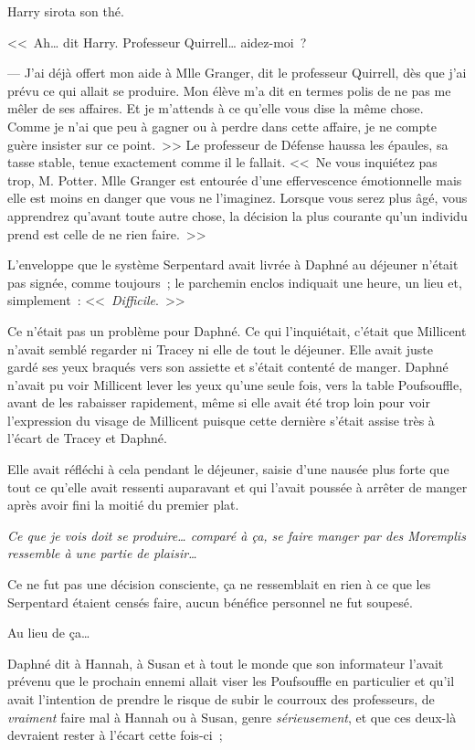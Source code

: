 Harry sirota son thé.

<<~Ah… dit Harry. Professeur Quirrell… aidez-moi~?

--- J'ai déjà offert mon aide à Mlle Granger, dit le professeur Quirrell, dès que j'ai prévu ce qui allait se produire. Mon élève m'a dit en termes polis de ne pas me mêler de ses affaires. Et je m'attends à ce qu'elle vous dise la même chose. Comme je n'ai que peu à gagner ou à perdre dans cette affaire, je ne compte guère insister sur ce point.~>> Le professeur de Défense haussa les épaules, sa tasse stable, tenue exactement comme il le fallait. <<~Ne vous inquiétez pas trop, M. Potter. Mlle Granger est entourée d'une effervescence émotionnelle mais elle est moins en danger que vous ne l'imaginez. Lorsque vous serez plus âgé, vous apprendrez qu'avant toute autre chose, la décision la plus courante qu'un individu prend est celle de ne rien faire.~>>

\later

L'enveloppe que le système Serpentard avait livrée à Daphné au déjeuner n'était pas signée, comme toujours~; le parchemin enclos indiquait une heure, un lieu et, simplement~: <<~\emph{Difficile}.~>>

Ce n'était pas un problème pour Daphné. Ce qui l'inquiétait, c'était que Millicent n'avait semblé regarder ni Tracey ni elle de tout le déjeuner. Elle avait juste gardé ses yeux braqués vers son assiette et s'était contenté de manger. Daphné n'avait pu voir Millicent lever les yeux qu'une seule fois, vers la table Poufsouffle, avant de les rabaisser rapidement, même si elle avait été trop loin pour voir l'expression du visage de Millicent puisque cette dernière s'était assise très à l'écart de Tracey et Daphné.

Elle avait réfléchi à cela pendant le déjeuner, saisie d'une nausée plus forte que tout ce qu'elle avait ressenti auparavant et qui l'avait poussée à arrêter de manger après avoir fini la moitié du premier plat.

\emph{Ce que je vois doit se produire… comparé à ça, se faire manger par des Moremplis ressemble à une partie de plaisir…}

Ce ne fut pas une décision consciente, ça ne ressemblait en rien à ce que les Serpentard étaient censés faire, aucun bénéfice personnel ne fut soupesé.

Au lieu de ça…

Daphné dit à Hannah, à Susan et à tout le monde que son informateur l'avait prévenu que le prochain ennemi allait viser les Poufsouffle en particulier et qu'il avait l'intention de prendre le risque de subir le courroux des professeurs, de \emph{vraiment} faire mal à Hannah ou à Susan, genre \emph{sérieusement}, et que ces deux-là devraient rester à l'écart cette fois-ci~;

